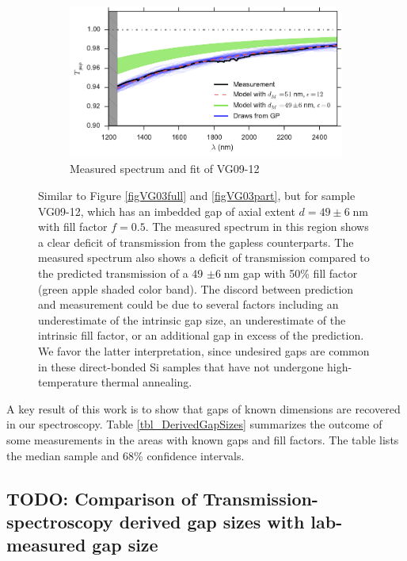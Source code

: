 \documentclass[osajnl,preprint,showpacs,superscriptaddress,12pt]{revtex4-1} %
\begin{document}
\begin{figure}[htbp]
        \begin{subfigure}[b]{0.5\textwidth}
                \includegraphics[width=\textwidth]{figs/VG12_twoGaps.pdf}
                \caption{Measured spectrum and fit of VG09-12}
                \label{figVG12_f50}
        \end{subfigure}
\caption{ Similar to Figure \ref{figVG03full} and \ref{figVG03part}, but for sample VG09-12, which has an imbedded gap of axial extent $d=49\pm6\;$nm with fill factor $f=0.5$.  The measured spectrum in this region shows a clear deficit of transmission from the gapless counterparts.  The measured spectrum also shows a deficit of transmission compared to the predicted transmission of a 49 $\pm6\;$nm gap with 50\% fill factor (green apple shaded color band).  The discord between prediction and measurement could be due to several factors including an underestimate of the intrinsic gap size, an underestimate of the intrinsic fill factor, or an additional gap in excess of the prediction.  We favor the latter interpretation, since undesired gaps are common in these direct-bonded Si samples that have not undergone high-temperature thermal annealing.
\label{figVG12}}
\end{figure}

A key result of this work is to show that gaps of known dimensions are recovered in our spectroscopy.  Table \ref{tbl_DerivedGapSizes} summarizes the outcome of some measurements in the areas with known gaps and fill factors.  The table lists the median sample and 68\% confidence intervals.

\subsection{TODO: Comparison of Transmission-spectroscopy derived gap sizes with lab-measured gap size}
\end{document}
